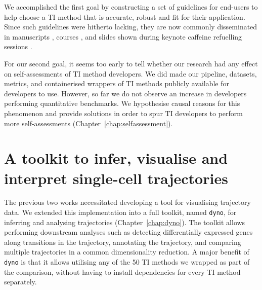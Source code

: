 We accomplished the first goal by constructing a set of guidelines for end-users to help choose a TI method that is accurate, robust and fit for their application. 
Since such guidelines were hitherto lacking, they are now commonly disseminated in manuscripts \cite{lafzi_tutorialguidelinesexperimental_2018,luecken_currentbestpractices_2019}, courses \cite{kiselev_analysissinglecell_2019,martens_analysissinglecell_2019}, and slides shown during keynote caffeine refuelling sessions \cite{hemberg_coffeebreakanalysis_2019}. 

For our second goal, it seems too early to tell whether our research had any effect on self-assessments of TI method developers. We did made our pipeline, datasets, metrics, and containerised wrappers of TI methods publicly available for developers to use.
However, so far we do not observe an increase in developers performing quantitative benchmarks. We hypothesise causal reasons for this phenomenon and provide solutions in order to spur TI developers to perform more self-assessments (Chapter~\ref{chap:selfassessment}).
\section{A toolkit to infer, visualise and interpret single-cell trajectories}

The previous two works necessitated developing a tool for visualising trajectory data. We extended this implementation into a full toolkit, named \texttt{dyno}, for inferring and analysing trajectories (Chapter~\ref{chap:dyno}). The toolkit allows performing downstream analyses such as detecting differentially expressed genes along transitions in the trajectory, annotating the trajectory, and comparing multiple trajectories in a common dimensionality reduction. A major benefit of \texttt{dyno} is that it allows utilising any of the 50 TI methods we wrapped as part of the comparison, without having to install dependencies for every TI method separately.

